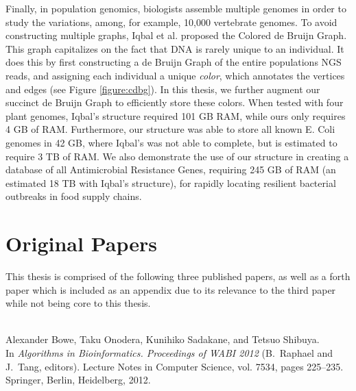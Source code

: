 \documentclass[a4paper,11pt]{article}
\newcommand\mypaper[2]{{\bigskip\noindent{\bf#1}\\\small#2\par\medskip}} %
\begin{document}
Finally, in population genomics, biologists assemble multiple genomes in order to study the variations, among, for example, 10,000 vertebrate genomes. To avoid constructing multiple graphs, Iqbal et al. proposed the Colored de Bruijn Graph. This graph capitalizes on the fact that DNA is rarely unique to an individual. It does this by first constructing a de Bruijn Graph of the entire populations NGS reads, and assigning each individual a unique \emph{color}, which annotates the vertices and edges (see Figure \ref{figure:cdbg}). In this thesis, we further augment our succinct de Bruijn Graph to efficiently store these colors. When tested with four plant genomes, Iqbal’s structure required 101 GB RAM, while ours only requires 4 GB of RAM. Furthermore, our structure was able to store all known E. Coli genomes in 42 GB, where Iqbal’s was not able to complete, but is estimated to require 3 TB of RAM. We also demonstrate the use of our structure in creating a database of all Antimicrobial Resistance Genes, requiring 245 GB of RAM (an estimated 18 TB with Iqbal’s structure), for rapidly locating resilient bacterial outbreaks in food supply chains.



\section*{Original Papers}

This thesis is comprised of the following three published papers, as well as a forth paper which is included as an appendix due to its relevance to the third paper while not being core to this thesis.


\medskip
\mypaper{Paper I: Succinct de Bruijn Graphs} 
{Alexander Bowe, Taku Onodera, Kunihiko Sadakane, and Tetsuo Shibuya.\\
In \textit{Algorithms in Bioinformatics. Proceedings of WABI 2012} (B.~Raphael and J.~Tang, editors). 
Lecture Notes in Computer Science, vol. 7534, pages 225--235. 
Springer, Berlin, Heidelberg, 2012.}
\end{document}
